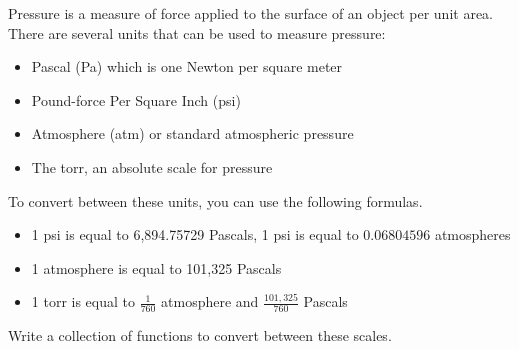 \begin{exer}
Pressure is a measure of force applied to the surface of an object 
per unit area.  There are several units that can be used to measure 
pressure:
\begin{itemize}
  \item Pascal (Pa) which is one Newton per square meter
  \item Pound-force Per Square Inch (psi) 
  \item Atmosphere (atm) or standard atmospheric pressure
  \item The torr, an absolute scale for pressure
\end{itemize}

To convert between these units, you can use the following formulas.
\begin{itemize}
  \item 1 psi is equal to 6,894.75729 Pascals, 1 psi is equal to $0.06804596$ atmospheres
  \item 1 atmosphere is equal to 101,325 Pascals
  \item 1 torr is equal to $\frac{1}{760}$ atmosphere and $\frac{101,325}{760}$ Pascals
\end{itemize}
Write a collection of functions to convert between these scales.
\end{exer}



